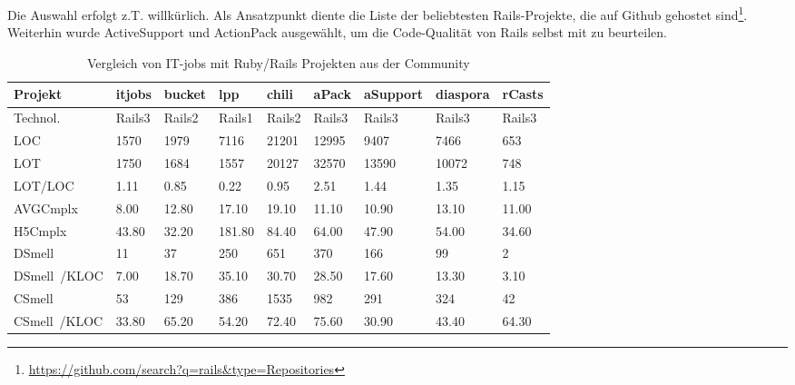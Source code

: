 Die Auswahl erfolgt z.T. willkürlich. Als Ansatzpunkt diente die Liste der beliebtesten Rails-Projekte, die auf Github gehostet sind\footnote{\url{https://github.com/search?q=rails&type=Repositories}}. Weiterhin wurde ActiveSupport und ActionPack ausgewählt, um die Code-Qualität von Rails selbst mit zu beurteilen.

\begin{table}[hbp]
 \caption{Vergleich von IT-jobs mit Ruby/Rails Projekten aus der Community}\label{table:cmpother}
 \begin{tabular}{|p{1.8cm}|l|l|l|l|l|l|l|l|}
\hline \rowcolor{tableheadcolor}
 Projekt&itjobs&bucket&lpp&chili&aPack&aSupport&diaspora&rCasts\\
\hline
Technol.&Rails3&Rails2&Rails1&Rails2&Rails3&Rails3&Rails3&Rails3\\
\hline
LOC&1570&1979&7116&21201&12995&9407&7466&653\\
\hline
LOT&1750&1684&1557&20127&32570&13590&10072&748\\
\hline
LOT/LOC&1.11&0.85&0.22&0.95&2.51&1.44&1.35&1.15\\
\hline
AVGCmplx&8.00&12.80&17.10&19.10&11.10&10.90&13.10&11.00\\
\hline
H5Cmplx&43.80&32.20&181.80&84.40&64.00&47.90&54.00&34.60\\
\hline
DSmell&11&37&250&651&370&166&99&2\\
\hline
DSmell\newline~/KLOC&7.00&18.70&35.10&30.70&28.50&17.60&13.30&3.10\\
\hline
CSmell&53&129&386&1535&982&291&324&42\\
\hline
CSmell\newline~/KLOC&33.80&65.20&54.20&72.40&75.60&30.90&43.40&64.30\\
\hline
\end{tabular}
\end{table}

